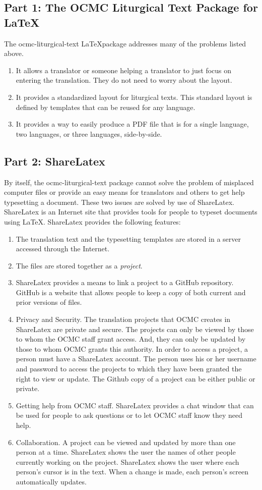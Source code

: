 \documentclass[]{memoir}
\begin{document}
\subsection{Part 1: The OCMC Liturgical Text Package for \LaTeX}
The ocmc-liturgical-text \LaTeX package addresses many of the problems listed above.
\begin{enumerate}
    \item It allows a translator or someone helping a translator to just focus on entering the translation.  They do not need to worry about the layout.
    \item It provides a standardized layout for liturgical texts.  This standard layout is defined by templates that can be reused for any language.
    \item It provides a way to easily produce a PDF file that is for a single language, two languages, or three languages, side-by-side.
\end{enumerate}
\subsection{Part 2: ShareLatex}
By itself, the ocmc-liturgical-text package cannot solve the problem of misplaced computer files or provide an easy means for translators and others to get help typesetting a document.  These two issues are solved by use of ShareLatex.  ShareLatex is an Internet site that provides tools for people to typeset documents using \LaTeX. ShareLatex provides the following features:
\begin{enumerate}
    \item The translation text and the typesetting templates are stored in a server accessed through the Internet.
    \item The files are stored together as a \textit{project}.
    \item ShareLatex provides a means to link a project to a GitHub repository.  GitHub is a website that allows people to keep a copy of both current and prior versions of files.  
    \item Privacy and Security.  The translation projects that OCMC creates in ShareLatex are private and secure.  The projects can only be viewed by those to whom the OCMC staff grant access.  And, they can only be updated by those to whom OCMC grants this authority. In order to access a project, a person must have a ShareLatex account.  The person uses his or her username and password to access the projects to which they have been granted the right to view or update.  The Github copy of a project can be either public or private.
    \item Getting help from OCMC staff.  ShareLatex provides a chat window that can be used for people to ask questions or to let OCMC staff know they need help.
    \item Collaboration.  A project can be viewed and updated by more than one person at a time.  ShareLatex shows the user the names of other people currently working on the project.  ShareLatex shows the user where each person's cursor is in the text.  When a change is made, each person's screen automatically updates.
\end{enumerate}
\end{document}
